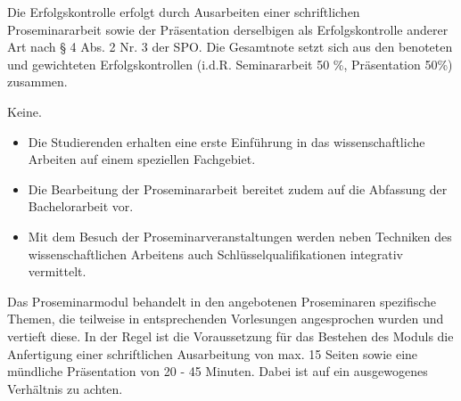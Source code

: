 \begin{course}

\setdoclanguagegerman
{}



\coursehead


\label{cour_6261.dp_997}


\begin{styleenv}
\begin{assessment}
Die Erfolgskontrolle erfolgt durch Ausarbeiten einer schriftlichen Proseminararbeit sowie der Präsentation derselbigen als Erfolgskontrolle anderer Art nach § 4 Abs. 2 Nr. 3 der SPO. Die Gesamtnote setzt sich aus den benoteten und gewichteten Erfolgskontrollen (i.d.R. Seminararbeit 50 \%, Präsentation 50\%) zusammen.


\end{assessment}

\begin{conditions}Keine.\end{conditions}


\end{styleenv}

\begin{learningoutcomes}
\begin{itemize}\item Die Studierenden erhalten eine erste Einführung in das wissenschaftliche Arbeiten auf einem speziellen Fachgebiet.  \item Die Bearbeitung der Proseminararbeit bereitet zudem auf die Abfassung der Bachelorarbeit vor.  \item Mit dem Besuch der Proseminarveranstaltungen werden neben Techniken des wissenschaftlichen Arbeitens auch Schlüsselqualifikationen integrativ vermittelt.  \end{itemize}
\end{learningoutcomes}

\begin{content}
Das Proseminarmodul behandelt in den angebotenen Proseminaren spezifische Themen, die teilweise in entsprechenden Vorlesungen angesprochen wurden und vertieft diese. In der Regel ist die Voraussetzung für das Bestehen des Moduls die Anfertigung einer schriftlichen Ausarbeitung von max. 15 Seiten sowie eine mündliche Präsentation von 20 - 45 Minuten. Dabei ist auf ein ausgewogenes Verhältnis zu achten.



\end{content}
\end{course}
